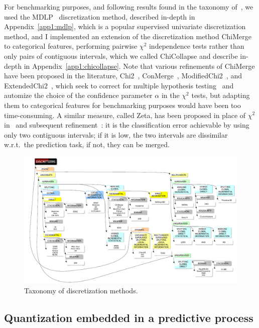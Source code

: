 For benchmarking purposes, and following results found in the taxonomy of~\cite{ramirez2016data}, we used the MDLP~\cite{fayyad1993multi} discretization method, described in-depth in Appendix~\ref{app1:mdlp}, which is a popular supervised univariate discretization method, and I implemented an extension of the discretization method ChiMerge~\cite{kerber1992chimerge} to categorical features, performing pairwise $\chi^2$ independence tests rather than only pairs of contiguous intervals, which we called ChiCollapse and describe in-depth in Appendix~\ref{app1:chicollapse}. Note that various refinements of ChiMerge have been proposed in the literature, Chi2~\cite{liu1995chi2}, ConMerge~\cite{wang1998concurrent}, ModifiedChi2~\cite{tay2002modified}, and ExtendedChi2~\cite{su2005extended}, which seek to correct for multiple hypothesis testing~\cite{shaffer1995multiple} and automize the choice of the confidence parameter $\alpha$ in the $\chi^2$ tests, but adapting them to categorical features for benchmarking purposes would have been too time-consuming. A similar measure, called Zeta, has been proposed in place of $\chi^2$ in~\cite{ho1997zeta} and subsequent refinement~\cite{ho1998efficient}: it is the classification error achievable by using only two contiguous intervals; if it is low, the two intervals are dissimilar w.r.t.\ the prediction task, if not, they can be merged.

\begin{figure}[!ht]
\includegraphics[width=\textwidth]{figures/chapitre4/taxonomy.PNG}
\caption{Taxonomy of discretization methods.}
\label{fig:taxonomy}
\end{figure}



\subsection{Quantization embedded in a predictive process} \label{subsec:embedding}

